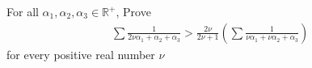For all $\alpha_1, \alpha_2,\alpha_3 \in \mathbb{R}^+$, Prove
\begin{align*} \sum \frac{1}{2\nu \alpha_1 +\alpha_2+\alpha_3} > \frac{2\nu}{2\nu +1} \left( \sum \frac{1}{\nu \alpha_1 + \nu \alpha_2 + \alpha_3} \right) \end{align*}for every positive real number $\nu$